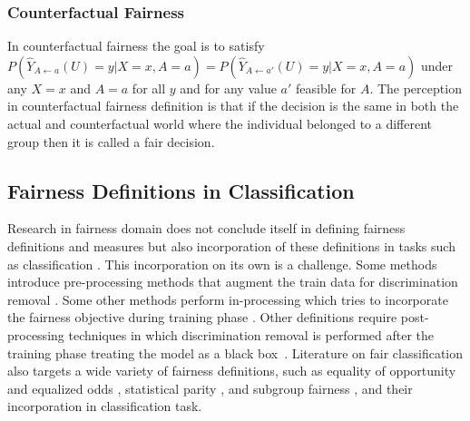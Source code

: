 \subsubsection{Counterfactual Fairness} In counterfactual fairness \cite{NIPS2017_6995} the goal is to satisfy
$P(\hat{Y}_{A\xleftarrow{}a }(U)=y|X=x,A=a) = P(\hat{Y}_{A\xleftarrow{}a'}(U)=y|X =x,A=a)$ under any $X=x$ and $A=a$ for all $y$ and for any value $a'$ feasible for $A$. The perception in counterfactual fairness definition is that if the decision is the same in both the actual and counterfactual world where the individual belonged to a different group then it is called a fair decision. 

\subsection{Fairness Definitions in Classification}
Research in fairness domain does not conclude itself in defining fairness definitions and measures but also incorporation of these definitions in tasks such as classification \cite{calders2010three,huang2019stable}. This incorporation on its own is a challenge. Some methods introduce pre-processing methods that augment the train data for discrimination removal \cite{Kamiran2012}. Some other methods perform in-processing which tries to incorporate the fairness objective during training phase \cite{kamishima2012fairness,zafar2015fairness,wu2018fairnessaware}. Other definitions require post-processing techniques in which discrimination removal is performed after the training phase treating the model as a black box~\cite{hardt2016equality,NIPS2017_7151}. Literature on fair classification also targets a wide variety of fairness definitions, such as equality of opportunity and equalized odds \cite{hardt2016equality,woodworth2017learning}, statistical parity \cite{agarwal2018reductions}, and subgroup fairness \cite{pmlr-v97-ustun19a}, and their incorporation in classification task.